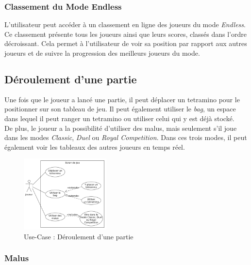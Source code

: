 \documentclass{report}
\begin{document}
\subsubsection{Classement du Mode Endless}

\noindent L'utilisateur peut accéder à un classement en ligne des joueurs du mode \emph{Endless}. Ce classement présente tous les joueurs ainsi que leurs scores, classés dans l'ordre décroissant. Cela permet à l'utilisateur de voir sa position par rapport aux autres joueurs et de suivre la progression des meilleurs joueurs du mode.





\subsection{Déroulement d’une partie}

\noindent Une fois que le joueur a lancé une partie, il peut déplacer un tetramino pour le positionner sur son tableau de jeu. Il peut également utiliser le \emph{bag}, un espace dans lequel il peut ranger un tetramino ou utiliser celui qui y est déjà stocké. \\

\noindent De plus, le joueur a la possibilité d'utiliser des malus, mais seulement s'il joue dans les modes \emph{Classic}, \emph{Duel} ou \emph{Royal Competition}. Dans ces trois modes, il peut également voir les tableaux des autres joueurs en temps réel.

\begin{figure}[H]
    \centering
     \includegraphics[width=0.4\textwidth, keepaspectratio]{src/user_req/jeu.png}
    \caption{Use-Case : Déroulement d'une partie}
    \label{fig:use_case_game}
\end{figure}

\subsubsection{Malus}
\end{document}
